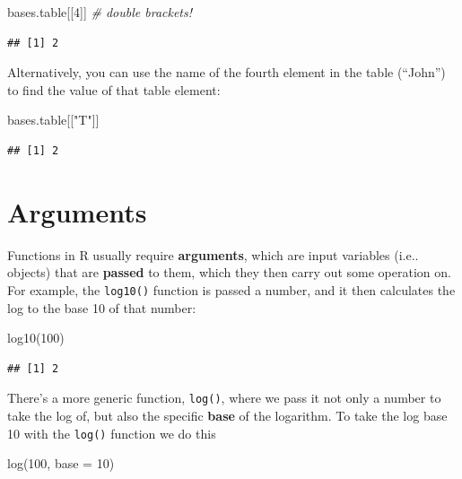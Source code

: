 \documentclass[
]{book}
\newenvironment{Shaded}{\begin{snugshade}}{\end{snugshade}}
\newcommand{\AttributeTok}[1]{\textcolor[rgb]{0.77,0.63,0.00}{#1}}
\newcommand{\CommentTok}[1]{\textcolor[rgb]{0.56,0.35,0.01}{\textit{#1}}}
\newcommand{\DecValTok}[1]{\textcolor[rgb]{0.00,0.00,0.81}{#1}}
\newcommand{\FunctionTok}[1]{\textcolor[rgb]{0.00,0.00,0.00}{#1}}
\newcommand{\NormalTok}[1]{#1}
\newcommand{\StringTok}[1]{\textcolor[rgb]{0.31,0.60,0.02}{#1}}
\begin{document}
\begin{Shaded}
\begin{Highlighting}[]
\NormalTok{bases.table[[}\DecValTok{4}\NormalTok{]]  }\CommentTok{\# double brackets!}
\end{Highlighting}
\end{Shaded}

\begin{verbatim}
## [1] 2
\end{verbatim}

Alternatively, you can use the name of the fourth element in the table (``John'') to find the value of that table element:

\begin{Shaded}
\begin{Highlighting}[]
\NormalTok{bases.table[[}\StringTok{"T"}\NormalTok{]]}
\end{Highlighting}
\end{Shaded}

\begin{verbatim}
## [1] 2
\end{verbatim}

\hypertarget{arguments}{%
\section{Arguments}\label{arguments}}

Functions in R usually require \textbf{arguments}, which are input variables (i.e.. objects) that are \textbf{passed} to them, which they then carry out some operation on. For example, the \texttt{log10()} function is passed a number, and it then calculates the log to the base 10 of that number:

\begin{Shaded}
\begin{Highlighting}[]
\FunctionTok{log10}\NormalTok{(}\DecValTok{100}\NormalTok{)}
\end{Highlighting}
\end{Shaded}

\begin{verbatim}
## [1] 2
\end{verbatim}

There's a more generic function, \texttt{log()}, where we pass it not only a number to take the log of, but also the specific \textbf{base} of the logarithm. To take the log base 10 with the \texttt{log()} function we do this

\begin{Shaded}
\begin{Highlighting}[]
\FunctionTok{log}\NormalTok{(}\DecValTok{100}\NormalTok{, }\AttributeTok{base =} \DecValTok{10}\NormalTok{)}
\end{Highlighting}
\end{Shaded}
\end{document}
